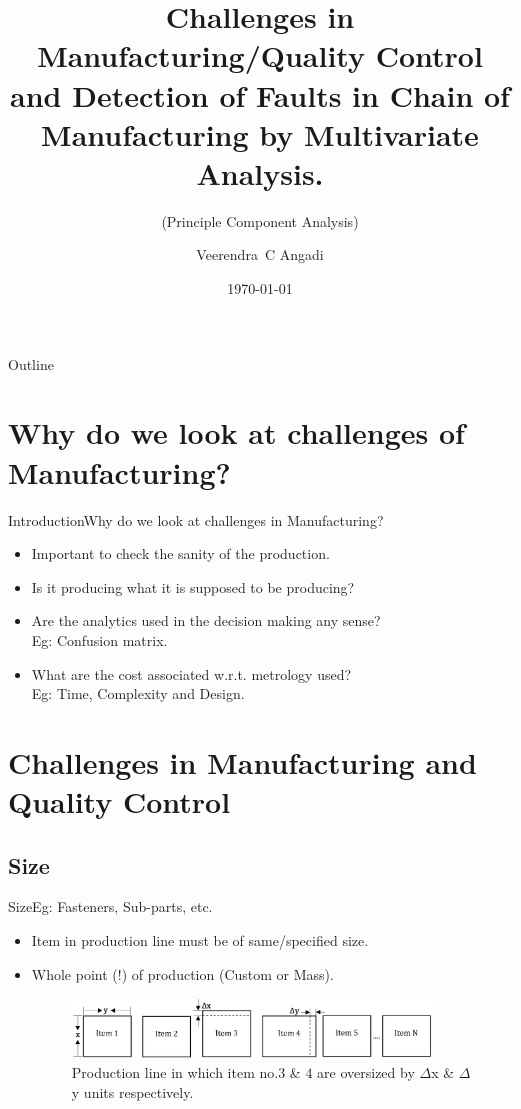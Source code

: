 \documentclass{beamer}
\title[Challenges in Mnfg/QC and Faults Detection using PCA]{Challenges in Manufacturing/Quality Control and Detection of Faults in Chain of Manufacturing by Multivariate Analysis.}
\subtitle{(Principle Component Analysis)}
\author{Veerendra~C Angadi}
\institute[University of Sheffield] %
{
  Department of Electronic and Electrical Engineering,\\
  George Porter Building, Red Hill - Broad Lane,\\
  University of Sheffield - S3 7HQ
}
\date{\today}
\begin{document}
\begin{frame}
  \titlepage
\end{frame}

\begin{frame}{Outline}
  \tableofcontents
\end{frame}

\section{Why do we look at challenges of Manufacturing?}


\begin{frame}{Introduction}{Why do we look at challenges in Manufacturing?}
  \begin{itemize}
    \item Important to check the sanity of the production.
    \item Is it producing what it is supposed to be producing?
    \item Are the analytics used in the decision making any sense? \\ Eg: Confusion matrix.
    \item What are the cost associated w.r.t. metrology used? \\ Eg: Time, Complexity and Design.
  \end{itemize}
\end{frame}

\section{Challenges in Manufacturing and Quality Control}

\subsection{Size}

\begin{frame}{Size}{Eg: Fasteners, Sub-parts, etc.}
  \begin{itemize}
  \item { Item in production line must be of same/specified size.
        \pause }
  \item Whole point (!) of production (Custom or Mass).

  \begin{figure}
    \includegraphics[width=0.9\textwidth]{size}
    \caption{Production line in which item no.$3$ \& $4$ are oversized by $\Delta$x \& $\Delta$y units respectively.}
    \label{fig:size_line}
  \end{figure}

  \end{itemize}
\end{frame}
\end{document}
